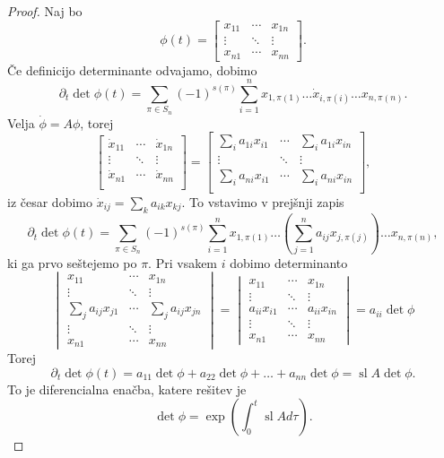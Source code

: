 \begin{proof}
  Naj bo
  \[
	\phi(t) =
	\begin{bmatrix}
	  x_{11} & \cdots & x_{1n} \\
	  \vdots & \ddots & \vdots \\
	  x_{n1} & \cdots & x_{nn}
	\end{bmatrix}.
  \]
  Če definicijo determinante odvajamo, dobimo
  \[
	\partial_t \det \phi(t)
	= \sum_{\pi \in S_n} (-1)^{s(\pi)} \sum_{i=1}^n x_{1,\pi(1)} \ldots
	\dot{x}_{i,\pi(i)} \ldots x_{n,\pi(n)}.
  \]
  Velja $\dot{\phi} = A \phi$, torej
  \[
	\begin{bmatrix}
	  \dot{x}_{11} & \cdots & \dot{x}_{1n} \\
	  \vdots & \ddots & \vdots \\
	  \dot{x}_{n1} & \cdots & \dot{x}_{nn} \\
	\end{bmatrix}
	=
	\begin{bmatrix}
	  \sum_i a_{1i} x_{i1} & \cdots & \sum_i a_{1i} x_{in} \\
	  \vdots & \ddots & \vdots \\
	  \sum_i a_{ni} x_{i1} & \cdots & \sum_i a_{ni} x_{in} \\
	\end{bmatrix},
  \]
  iz česar dobimo $\dot{x}_{ij} = \sum_k a_{ik} x_{kj}$.
  To vstavimo v prejšnji zapis
  \[
	\partial_t \det \phi(t)
	= \sum_{\pi \in S_n} (-1)^{s(\pi)} \sum_{i=1}^n x_{1,\pi(1)} \ldots \left(
	  \sum_{j=1}^n a_{ij} x_{j,\pi(j)}
	\right) \ldots x_{n,\pi(n)},
  \]
  ki ga prvo seštejemo po $\pi$.
  Pri vsakem $i$ dobimo determinanto
  \[
	\begin{vmatrix}
	  x_{11} & \cdots & x_{1n} \\
	  \vdots & \ddots & \vdots \\
	  \sum_j a_{ij} x_{j1} & \cdots & \sum_j a_{ij} x_{jn} \\
	  \vdots & \ddots & \vdots \\
	  x_{n1} & \cdots & x_{nn}
	\end{vmatrix}
	=
	\begin{vmatrix}
	  x_{11} & \cdots & x_{1n} \\
	  \vdots & \ddots & \vdots \\
	  a_{ii} x_{i1} & \cdots & a_{ii} x_{in} \\
	  \vdots & \ddots & \vdots \\
	  x_{n1} & \cdots & x_{nn}
	\end{vmatrix}
	= a_{ii} \det \phi
  \]
  Torej
  \[
	\partial_t \det \phi(t)
	= a_{11} \det \phi + a_{22} \det \phi + \ldots + a_{nn} \det \phi
	= \operatorname{sl} A \det \phi.
  \]
  To je diferencialna enačba, katere rešitev je
  \[
	\det \phi = \exp\left( \int_0^t \operatorname{sl} A d\tau \right).
  \]
\end{proof}

